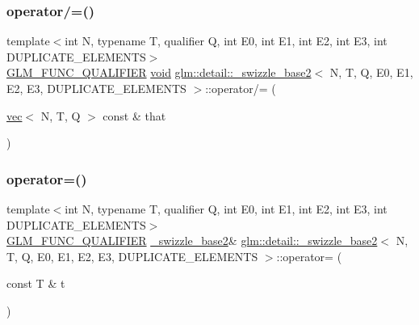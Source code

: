 \mbox{\label{structglm_1_1detail_1_1__swizzle__base2_ad4ef23a8bcf9b2474f08c5f1960e3fbd}} 
\subsubsection{\texorpdfstring{operator/=()}{operator/=()}}
{\footnotesize\ttfamily template$<$int N, typename T, qualifier Q, int E0, int E1, int E2, int E3, int D\+U\+P\+L\+I\+C\+A\+T\+E\+\_\+\+E\+L\+E\+M\+E\+N\+TS$>$ \\
\mbox{\hyperlink{setup_8hpp_a33fdea6f91c5f834105f7415e2a64407}{G\+L\+M\+\_\+\+F\+U\+N\+C\+\_\+\+Q\+U\+A\+L\+I\+F\+I\+ER}} \mbox{\hyperlink{_s_d_l__opengles2__gl2ext_8h_ae5d8fa23ad07c48bb609509eae494c95}{void}} \mbox{\hyperlink{structglm_1_1detail_1_1__swizzle__base2}{glm\+::detail\+::\+\_\+swizzle\+\_\+base2}}$<$ N, T, Q, E0, E1, E2, E3, D\+U\+P\+L\+I\+C\+A\+T\+E\+\_\+\+E\+L\+E\+M\+E\+N\+TS $>$\+::operator/= (\begin{DoxyParamCaption}\item[{\mbox{\hyperlink{structglm_1_1vec}{vec}}$<$ N, T, Q $>$ const \&}]{that }\end{DoxyParamCaption})\hspace{0.3cm}{\ttfamily [inline]}}

\mbox{\label{structglm_1_1detail_1_1__swizzle__base2_a48c3cc524e3e408243a1ee4ef42cd90c}} 
\subsubsection{\texorpdfstring{operator=()}{operator=()}\hspace{0.1cm}{\footnotesize\ttfamily [1/2]}}
{\footnotesize\ttfamily template$<$int N, typename T, qualifier Q, int E0, int E1, int E2, int E3, int D\+U\+P\+L\+I\+C\+A\+T\+E\+\_\+\+E\+L\+E\+M\+E\+N\+TS$>$ \\
\mbox{\hyperlink{setup_8hpp_a33fdea6f91c5f834105f7415e2a64407}{G\+L\+M\+\_\+\+F\+U\+N\+C\+\_\+\+Q\+U\+A\+L\+I\+F\+I\+ER}} \mbox{\hyperlink{structglm_1_1detail_1_1__swizzle__base2}{\+\_\+swizzle\+\_\+base2}}\& \mbox{\hyperlink{structglm_1_1detail_1_1__swizzle__base2}{glm\+::detail\+::\+\_\+swizzle\+\_\+base2}}$<$ N, T, Q, E0, E1, E2, E3, D\+U\+P\+L\+I\+C\+A\+T\+E\+\_\+\+E\+L\+E\+M\+E\+N\+TS $>$\+::operator= (\begin{DoxyParamCaption}\item[{const T \&}]{t }\end{DoxyParamCaption})\hspace{0.3cm}{\ttfamily [inline]}}

